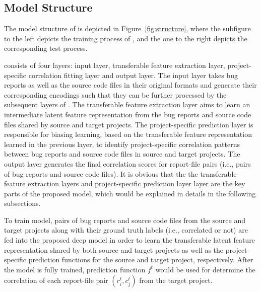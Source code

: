 \subsection{Model Structure}

The model structure of \TRANPCNN is depicted in Figure~\ref{fig:structure}, where the subfigure to the left depicts the training process of \TRANPCNN, and the one to the right depicts the corresponding test process.


\TRANPCNN consists of four layers: input layer, transferable feature extraction layer, project-specific correlation fitting layer and output layer. The input layer takes bug reports as well as the source code files in their original formats and generate their corresponding encodings such that they can be further processed by the subsequent layers of \TRANPCNN. The transferable feature extraction layer aims to learn an intermediate latent feature representation from the bug reports and source code files shared by source and target projects.  The project-specific prediction layer is responsible for biasing learning, based on the transferable feature representation learned in the previous layer, to identify project-specific correlation patterns between bug reports and source code files in source and target projects. The output layer generates the final correlation scores for report-file pairs (i.e., pairs of bug reports and source code files). It is obvious that the the transferable feature extraction layers and project-specific prediction layer layer are the key parts of the proposed model, which would be explained in details in the following subsections. %


To train \TRANPCNN model, pairs of bug reports and source code files from the source and target projects along with their ground truth labels (i.e., correlated or not) are fed into the proposed deep model in order to learn the transferable latent feature representation shared by both source and target projects as well as the project-specific prediction functions for the source and target project, respectively. After the model is fully trained, prediction function $f^{t}$ would be used for determine the correlation of each report-file pair $(r_i^t, c_j^t)$ from the target project.

